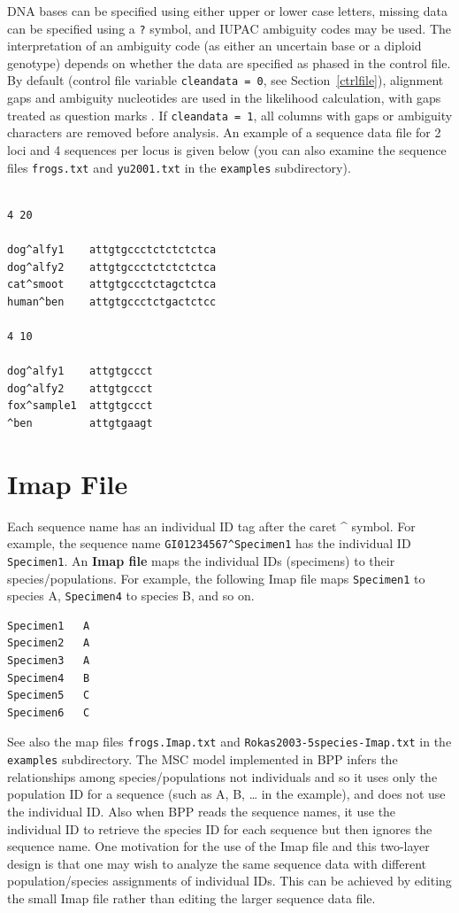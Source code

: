 \documentclass[a4paper]{book}
\numberwithin{equation}{section} \renewcommand{\baselinestretch}{0.55}
\begin{document}
DNA bases can be specified using either upper or lower case
letters, missing data can be specified using a \texttt{?} symbol,
and IUPAC ambiguity codes may be used. The interpretation of an
ambiguity code (as either an uncertain base or a diploid genotype)
depends on whether the data are specified as phased in the control
file.  By default (control file variable \texttt{cleandata = 0}, see Section~\ref{ctrlfile}), alignment gaps and
ambiguity nucleotides are used in the likelihood calculation, with
gaps treated as question marks
\citep[see][pp.~111-112]{Yang2014b}.  If \texttt{cleandata = 1},
all columns with gaps or ambiguity characters are removed before
analysis. An example of a sequence data file for 2 loci and 4
sequences per locus is given below (you can also examine the
sequence files \texttt{frogs.txt} and \texttt{yu2001.txt} in the
\texttt{examples} subdirectory).
\begin{verbatim}

4 20

dog^alfy1    attgtgccctctctctctca
dog^alfy2    attgtgccctctctctctca
cat^smoot    attgtgccctctagctctca
human^ben    attgtgccctctgactctcc

4 10

dog^alfy1    attgtgccct
dog^alfy2    attgtgccct
fox^sample1  attgtgccct
^ben         attgtgaagt

\end{verbatim}

\section{Imap File} \label{imapfile} Each sequence name has an
individual ID tag after the caret \^{} symbol. For example, the
sequence name \texttt{GI01234567\^{}Specimen1} has the individual
ID \texttt{Specimen1}.  An \textbf{Imap file} maps the individual IDs
(specimens) to their species/populations.  For example, the
following Imap file maps \texttt{Specimen1} to species A, \texttt{Specimen4}
to species B, and so on.
\begin{verbatim}
Specimen1   A
Specimen2   A
Specimen3   A
Specimen4   B
Specimen5   C
Specimen6   C
\end{verbatim}
See also the map files \texttt{frogs.Imap.txt} and
\texttt{Rokas2003-5species-Imap.txt} in the \texttt{examples} subdirectory.
The MSC model implemented in \textsc{BPP} infers the relationships
among species/populations not individuals and so it uses only the
population ID for a sequence (such as A, B, … in the example), and
does not use the individual ID.  Also when \textsc{BPP} reads the
sequence names, it use the individual ID to retrieve the species
ID for each sequence but then ignores the sequence name.  One
motivation for the use of the Imap file and this two-layer design
is that one may wish to analyze the same sequence data with
different population/species assignments of individual IDs. This
can be achieved by editing the small Imap file rather than editing
the larger sequence data file.
\end{document}
